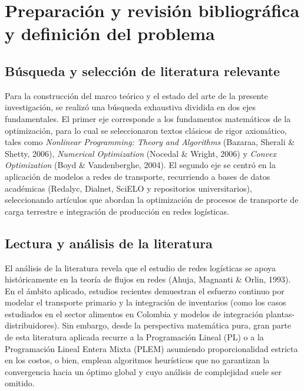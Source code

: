\section{Preparación y revisión bibliográfica y definición del problema}

\subsection{Búsqueda y selección de literatura relevante}
Para la construcción del marco teórico y el estado del arte de la presente investigación, se realizó una búsqueda exhaustiva dividida en dos ejes fundamentales. El primer eje corresponde a los fundamentos matemáticos de la optimización, para lo cual se seleccionaron textos clásicos de rigor axiomático, tales como \textit{Nonlinear Programming: Theory and Algorithms} (Bazaraa, Sherali \& Shetty, 2006), \textit{Numerical Optimization} (Nocedal \& Wright, 2006) y \textit{Convex Optimization} (Boyd \& Vandenberghe, 2004). El segundo eje se centró en la aplicación de modelos a redes de transporte, recurriendo a bases de datos académicas (Redalyc, Dialnet, SciELO y repositorios universitarios), seleccionando artículos que abordan la optimización de procesos de transporte de carga terrestre e integración de producción en redes logísticas.

\subsection{Lectura y análisis de la literatura}
El análisis de la literatura revela que el estudio de redes logísticas se apoya históricamente en la teoría de flujos en redes (Ahuja, Magnanti \& Orlin, 1993). En el ámbito aplicado, estudios recientes demuestran el esfuerzo continuo por modelar el transporte primario y la integración de inventarios (como los casos estudiados en el sector alimentos en Colombia y modelos de integración plantas-distribuidores). Sin embargo, desde la perspectiva matemática pura, gran parte de esta literatura aplicada recurre a la Programación Lineal (PL) o a la Programación Lineal Entera Mixta (PLEM) asumiendo proporcionalidad estricta en los costos, o bien, emplean algoritmos heurísticos que no garantizan la convergencia hacia un óptimo global y cuyo análisis de complejidad suele ser omitido.

